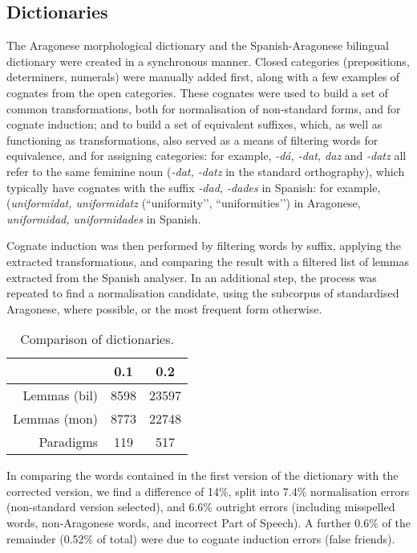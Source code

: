 \documentclass[10pt,a4paper,twocolumn]{article}
\begin{document}
  \subsection{Dictionaries}
  
  The Aragonese morphological dictionary and the Spanish-Aragonese bilingual dictionary were created in a synchronous manner. Closed categories (prepositions, determiners, numerals) were manually added first, along with a few examples of cognates from the open categories. These cognates were used to build a set of common transformations, both for normalisation of non-standard forms, and for cognate induction; and to build a set of equivalent suffixes, which, as well as functioning as transformations, also served as a means of filtering words for equivalence, and for assigning categories: for example, {\em -dá,  -dat, daz} and {\em -datz} all refer to the same feminine noun ({\em -dat, -datz} in the standard orthography), which typically have cognates with the suffix {\em -dad, -dades} in Spanish: for example, ({\em uniformidat, uniformidatz} (``uniformity’’, ``uniformities’’) in Aragonese, {\em uniformidad, uniformidades} in Spanish.

  Cognate induction was then performed by filtering words by suffix, applying the extracted transformations, and comparing the result with a filtered list of lemmas extracted from the Spanish analyser. In an additional step, the process was repeated to find a normalisation candidate, using the subcorpus of standardised Aragonese, where possible, or the most frequent form otherwise.
  
  \begin{table}
  \begin{center}
  \caption{Comparison of dictionaries.\label{tab:phases}}
  \begin{tabular}{|r|c|c|}
  \hline
    & 0.1 & 0.2 \\
  \hline
  Lemmas (bil) & 8598  & 23597 \\
  \hline
  Lemmas (mon) & 8773  & 22748\\
  Paradigms    & 119   & 517  \\
  \hline
  \end{tabular}
  \end{center}
  \end{table}
  
  In comparing the words contained in the first version of the dictionary with the corrected version, we find a difference of 14\%, split into 7.4\% normalisation errors (non-standard version selected), and 6.6\% outright errors (including misspelled words, non-Aragonese words, and incorrect Part of Speech). A further 0.6\% of the remainder (0.52\% of total) were due to cognate induction errors (false friends).
  
\end{document}
